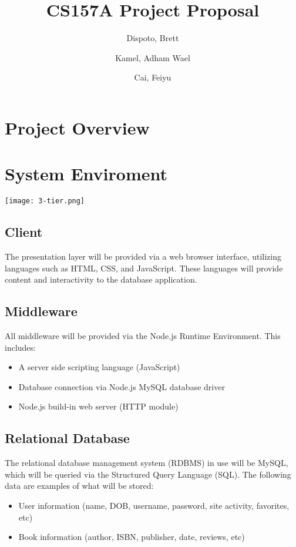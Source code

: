 \documentclass[titlepage]{article}
\author{ Dispoto, Brett\\
	\and
	Kamel, Adham Wael\\
	\and
	Cai, Feiyu\\
}
\title{CS157A Project Proposal}
\begin{document}
	\maketitle
	
	\section{Project Overview}	
	



	\section{System Enviroment}
	
	\texttt{[image: 3-tier.png]}
	
	\subsection{Client}
		The presentation layer will be provided via a web browser interface, utilizing languages such as HTML, CSS, and JavaScript. These languages will provide content and interactivity to the database application.
	\subsection{Middleware}
		All middleware will be provided via the Node.js Runtime Environment. This includes: 
	\begin{itemize}
		\item A server side scripting language (JavaScript)
		\item Database connection via Node.js MySQL database driver	
		\item Node.js build-in web server (HTTP module)
	\end{itemize}
	
	\subsection{Relational Database}
		The relational database management system (RDBMS) in use will be MySQL, which will be queried via the Structured Query Language (SQL). The following data are examples of what will be stored:
	\begin{itemize}
		\item User information (name, DOB, username, password, site activity, favorites, etc)
		\item Book information (author, ISBN, publisher, date, reviews, etc)
	\end{itemize}
\end{document}
